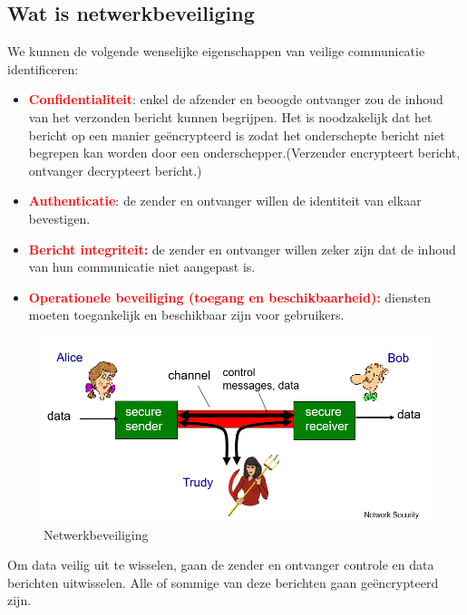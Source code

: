 \subsection{Wat is netwerkbeveiliging}
\noindent We kunnen de volgende wenselijke eigenschappen van veilige communicatie identificeren:
\begin{itemize}
    \item \textcolor{red}{\textbf{Confidentialiteit}}: enkel de afzender en beoogde ontvanger zou de inhoud van het verzonden bericht kunnen begrijpen. Het is noodzakelijk dat het bericht op een manier geëncrypteerd is zodat het onderschepte bericht niet begrepen kan worden door een onderschepper.(Verzender encrypteert bericht, ontvanger decrypteert bericht.)
    \item \textcolor{red}{\textbf{Authenticatie}}: de zender en ontvanger willen de identiteit van elkaar bevestigen.
    \item \textcolor{red}{\textbf{Bericht integriteit:}} de zender en ontvanger willen zeker zijn dat de inhoud van hun communicatie niet aangepast is.
    \item \textcolor{red}{\textbf{Operationele beveiliging (toegang en beschikbaarheid):}} diensten moeten toegankelijk en beschikbaar zijn voor gebruikers.
\end{itemize}

\begin{figure}[h]
    \centering
    \includegraphics[width=5in]{./img/imghfdst8/hfdst8puntje1.png}
    \caption{Netwerkbeveiliging }      
    \label{fig:Netwerkbeveiliging }
\end{figure}
\noindent Om data veilig uit te wisselen, gaan de zender en ontvanger controle en data berichten uitwisselen. Alle of sommige van deze berichten gaan geëncrypteerd zijn. 

